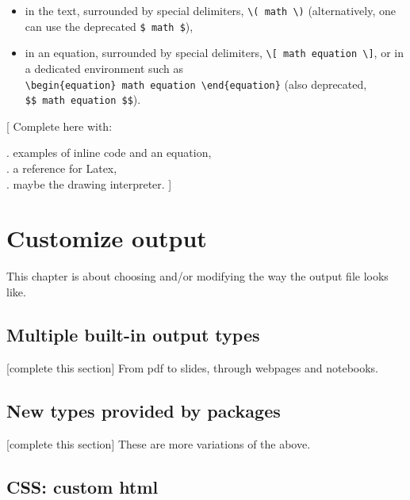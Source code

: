 \documentclass[]{book}
\providecommand{\tightlist}{%
  \setlength{\itemsep}{0pt}\setlength{\parskip}{0pt}}
\theoremstyle{definition}
\theoremstyle{definition}
\theoremstyle{definition}
\theoremstyle{remark}
\begin{document}
\begin{itemize}
\tightlist
\item
  in the text, surrounded by special delimiters,
  \texttt{\textbackslash{}(\ math\ \textbackslash{})} (alternatively,
  one can use the deprecated \texttt{\$\ math\ \$}),
\item
  in an equation, surrounded by special delimiters,
  \texttt{\textbackslash{}{[}\ math\ equation\ \textbackslash{}{]}}, or
  in a dedicated environment such as
  \texttt{\textbackslash{}begin\{equation\}\ math\ equation\ \textbackslash{}end\{equation\}}
  (also deprecated, \texttt{\$\$\ math\ equation\ \$\$}).
\end{itemize}

{[} Complete here with:

. examples of inline code and an equation,\\
. a reference for Latex,\\
. maybe the drawing interpreter. {]}

\hypertarget{custom-ouptut}{%
\chapter{Customize output}\label{custom-ouptut}}

This chapter is about choosing and/or modifying the way the output file
looks like.

\hypertarget{multiple-built-in-output-types}{%
\section{Multiple built-in output
types}\label{multiple-built-in-output-types}}

{[}complete this section{]} From pdf to slides, through webpages and
notebooks.

\hypertarget{new-types-provided-by-packages}{%
\section{New types provided by
packages}\label{new-types-provided-by-packages}}

{[}complete this section{]} These are more variations of the above.

\hypertarget{css-custom-html}{%
\section{CSS: custom html}\label{css-custom-html}}
\end{document}
